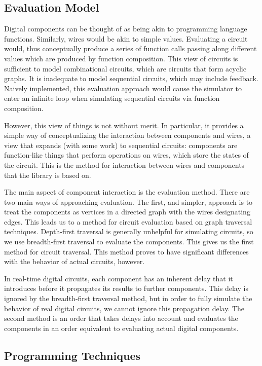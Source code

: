 \documentclass{article}
\begin{document}
\subsection{Evaluation Model}

Digital components can be thought of as being akin to programming language functions. Similarly, wires would be akin to simple values. Evaluating a circuit would, thus conceptually produce a series of function calls passing along different values which are produced by function composition. This view of circuits is sufficient to model combinational circuits, which are circuits that form acyclic graphs. It is inadequate to model sequential circuits, which may include feedback. Naively implemented, this evaluation approach would cause the simulator to enter an infinite loop when simulating sequential circuits via function composition.

However, this view of things is not without merit. In particular, it provides a simple way of conceptualizing the interaction between components and wires, a view that expands (with some work) to sequential circuits: components are function-like things that perform operations on wires, which store the states of the circuit. This is the method for interaction between wires and components that the library is based on.

The main aspect of component interaction is the evaluation method. There are two main ways of approaching evaluation. The first, and simpler, approach  is to treat the components as vertices in a directed graph with the wires designating edges. This leads us to a method for circuit evaluation based on graph traversal techniques. Depth-first traversal is generally unhelpful for simulating circuits, so we use breadth-first traversal to evaluate the components. This gives us the first method for circuit traversal. This method proves to have significant differences with the behavior of actual circuits, however.

In real-time digital circuits, each component has an inherent delay that it introduces before it propagates its results to further components. This delay is ignored by the breadth-first traversal method, but in order to fully simulate the behavior of real digital circuits, we cannot ignore this propagation delay. The second method is an order that takes delays into account and evaluates the components in an order equivalent to evaluating actual digital components.

\subsection{Programming Techniques}
\end{document}
